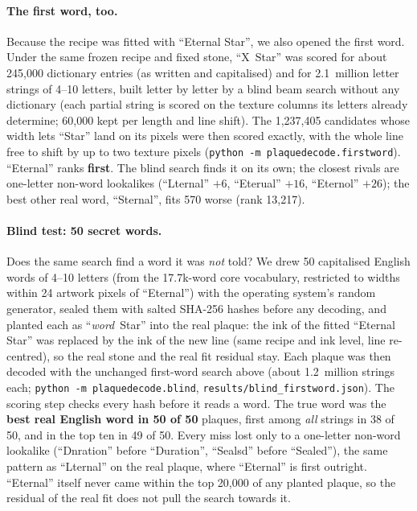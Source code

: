\documentclass[10pt,a4paper]{article}
\newcommand{\q}[1]{``#1''}
\begin{document}
\paragraph{The first word, too.}
Because the recipe was fitted with \q{Eternal Star}, we also opened the first word. Under the same frozen recipe and
fixed stone, \q{X~Star} was scored for about 245{,}000 dictionary entries (as written and capitalised) and for
2.1~million letter strings of 4--10 letters, built letter by letter by a blind beam search without any dictionary
(each partial string is scored on the texture columns its letters already determine; 60{,}000 kept per length and
line shift). The 1{,}237{,}405 candidates whose width lets \q{Star} land on its pixels were then scored exactly, with
the whole line free to shift by up to two texture pixels (\texttt{python -m plaquedecode.firstword}).
\q{Eternal} ranks \textbf{first}. The blind search finds it on its own; the closest rivals are one-letter non-word
lookalikes (\q{Lternal} $+6$, \q{Eterual} $+16$, \q{Eternol} $+26$); the best other real word, \q{Sternal}, fits 570
worse (rank 13{,}217).

\paragraph{Blind test: 50 secret words.}
Does the same search find a word it was \emph{not} told? We drew 50 capitalised English words of 4--10 letters
(from the 17.7k-word core vocabulary, restricted to widths within 24 artwork pixels of \q{Eternal}) with the operating
system's random generator, sealed them with salted SHA-256 hashes before any decoding, and planted each as
\q{\emph{word}~Star} into the real plaque: the ink of the fitted \q{Eternal Star} was replaced by the ink of the new line
(same recipe and ink level, line re-centred), so the real stone and the real fit residual stay. Each plaque was then
decoded with the unchanged first-word search above (about 1.2~million strings each; \texttt{python -m plaquedecode.blind},
\texttt{results/blind\_firstword.json}). The scoring step checks every hash before it reads a word.
The true word was the \textbf{best real English word in 50 of 50} plaques, first among \emph{all} strings in 38 of 50, and in
the top ten in 49 of 50. Every miss lost only to a one-letter non-word lookalike (\q{Dnration} before \q{Duration},
\q{Sealsd} before \q{Sealed}), the same pattern as \q{Lternal} on the real plaque, where \q{Eternal} is first outright.
\q{Eternal} itself never came within the top 20{,}000 of any planted plaque, so the residual of the real fit does not
pull the search towards it.
\end{document}
